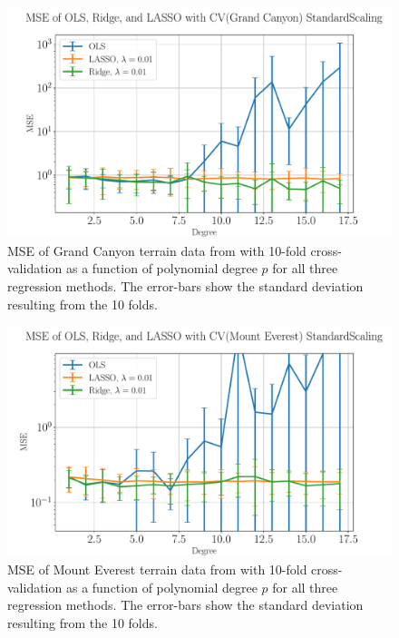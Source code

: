 \documentclass[%
reprint,
amsmath,amssymb,
aps,
pra,
]{revtex4-2}
\begin{document}
\begin{figure}[ht!]
	\centering
	\includegraphics[width=\linewidth]{Python/Figures/Terrain/MSE_GrandCanyon_StandardScaling_50.pdf}
	\caption{MSE of Grand Canyon terrain data from \cite{USGS_EarthExplorer} with 10-fold cross-validation as a function of polynomial degree $p$ for all three regression methods. The error-bars show the standard deviation resulting from the 10 folds.}
	\label{fig:MSE_GrandCan_StandardScaling_50}
\end{figure}

\begin{figure}[ht!]
	\centering
	\includegraphics[width=\linewidth]{Python/Figures/Terrain/MSE_MountEverest_StandardScaling_50.pdf}
	\caption{MSE of Mount Everest terrain data from \cite{USGS_EarthExplorer} with 10-fold cross-validation as a function of polynomial degree $p$ for all three regression methods. The error-bars show the standard deviation resulting from the 10 folds.}
	\label{fig:MSE_MountEve_StandardScaling_50}
\end{figure}
\end{document}
